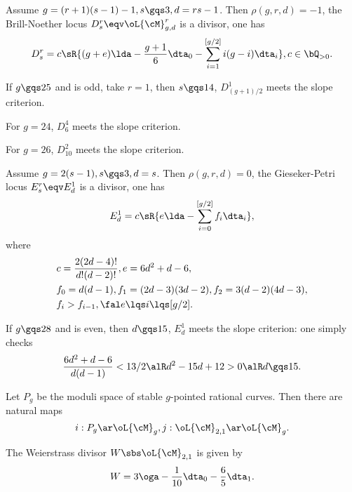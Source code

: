 \documentclass[article, a4paper, twoside]{universal}
\begin{document}

\begin{thm}
	Assume $g=(r+1)(s-1)-1, s\gqs3, d=rs-1$. Then $\rho(g,r,d)=-1$, the Brill-Noether locus $D_{s}^{r}\eqv\oL{\cM}_{g,d}^{r}$ is a divisor, one has
	\[
		D_{s}^{r}=c\sR{(g+e)\lda-\frac{g+1}{6}\dta_{0}-\sum_{i=1}^{[g/2]}i(g-i)\dta_{i}}, c\in\bQ_{>0}.
	\]
\end{thm}

\begin{cor}
	If $g\gqs25$ and is odd, take $r=1$, then $s\gqs14$, $D_{(g+1)/2}^{1}$ meets the slope criterion.

	For $g=24$, $D_{6}^{4}$ meets the slope criterion.

	For $g=26$, $D_{10}^{2}$ meets the slope criterion.
\end{cor}


\begin{thm}
	Assume $g=2(s-1), s\gqs3, d=s$. Then $\rho(g,r,d)=0$, the Gieseker-Petri locus $E_{s}^{r}\eqv E_{d}^{1}$ is a divisor, one has
	\[
		E_{d}^{1}=c\sR{e\lda-\sum_{i=0}^{[g/2]}f_{i}\dta_{i}},
	\]
	where
	\begin{align*}
	  &c=\frac{2(2d-4)!}{d!(d-2)!}, e=6d^{2}+d-6,\\
	  &f_{0}=d(d-1), f_{1}=(2d-3)(3d-2), f_{2}=3(d-2)(4d-3),\\
	  &f_{i}>f_{i-1}, \fal e\lqs i\lqs [g/2].
	\end{align*}
\end{thm}

\begin{cor}
	If $g\gqs28$ and is even, then $d\gqs15$, $E_{d}^{1}$ meets the slope criterion: one simply checks
	\[
		\frac{6d^{2}+d-6}{d(d-1)}<13/2\alR d^{2}-15d+12>0\alR d\gqs15.
	\]
\end{cor}

\begin{stp}
	Let $P_{g}$ be the moduli space of stable $g$-pointed rational curves. Then there are natural maps
	\[
		i:P_{g}\ar\oL{\cM}_{g}, j:\oL{\cM}_{2,1}\ar\oL{\cM}_{g}.
	\]
\end{stp}


\begin{thm}[Theorem~2.2]
	The Weierstrass divisor $W\sbs\oL{\cM}_{2,1}$ is given by
	\[
		W=3\oga-\frac{1}{10}\dta_{0}-\frac{6}{5}\dta_{1}.
	\]
\end{thm}
\end{document}

